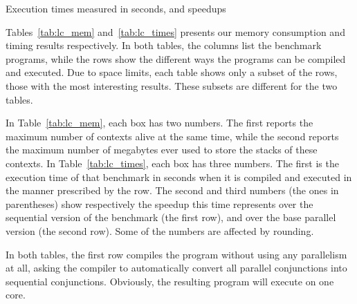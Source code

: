 \begin{sidewaystable}[tbp]
\begin{center}

\caption{Execution times measured in seconds, and speedups}
\label{tab:lc_times}
\end{center}
\end{sidewaystable}


Tables~\ref{tab:lc_mem} and~\ref{tab:lc_times}
presents our memory consumption and timing results respectively.
In both tables,
the columns list the benchmark programs,
while the rows show the different ways
the programs can be compiled and executed.
Due to space limits,
each table shows only a subset of the rows,
those with the most interesting results.
These subsets are different for the two tables.

In Table~\ref{tab:lc_mem}, each box has two numbers.
The first reports the maximum number of contexts alive at the same time,
while the second reports the maximum number of megabytes
ever used to store the stacks of these contexts.
In Table~\ref{tab:lc_times}, each box has three numbers.
The first is the execution time of that benchmark in seconds
when it is compiled and executed in the manner prescribed by the row.
The second and third numbers (the ones in parentheses)
show respectively the speedup this time represents
over the sequential version of the benchmark (the first row),
and over the base parallel version (the second row).
Some of the numbers are affected by rounding.

In both tables, the first row
compiles the program without using any parallelism at all,
asking the compiler to automatically convert
all parallel conjunctions into sequential conjunctions.
Obviously, the resulting program will execute on one core.

